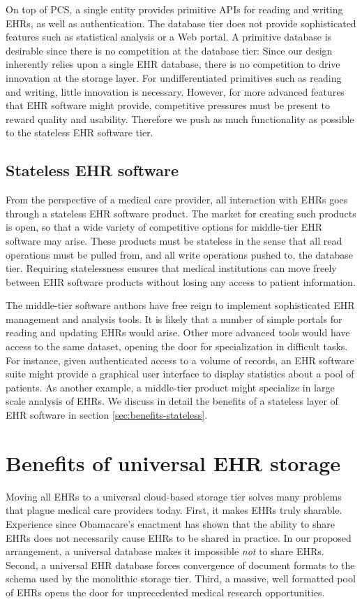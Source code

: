 On top of PCS, a single entity provides primitive APIs for reading and writing EHRs, as well as authentication. The database tier does not provide sophisticated features such as statistical analysis or a Web portal. A primitive database is desirable since there is no competition at the database tier: Since our design inherently relies upon a single EHR database, there is no competition to drive innovation at the storage layer. For undifferentiated primitives such as reading and writing, little innovation is necessary. However, for more advanced features that EHR software might provide, competitive pressures must be present to reward quality and usability. Therefore we push as much functionality as possible to the stateless EHR software tier.

\subsection{Stateless EHR software}\label{sec:stateless}
From the perspective of a medical care provider, all interaction with EHRs goes through a stateless EHR software product. The market for creating such products is open, so that a wide variety of competitive options for middle-tier EHR software may arise. These products must be stateless in the sense that all read operations must be pulled from, and all write operations pushed to, the database tier. Requiring statelessness ensures that medical institutions can move freely between EHR software products without losing any access to patient information.

The middle-tier software authors have free reign to implement sophisticated EHR management and analysis tools. It is likely that a number of simple portals for reading and updating EHRs would arise. Other more advanced tools would have access to the same dataset, opening the door for specialization in difficult tasks. For instance, given authenticated access to a volume of records, an EHR software suite might provide a graphical user interface to display statistics about a pool of patients. As another example, a middle-tier product might specialize in large scale analysis of EHRs. We discuss in detail the benefits of a stateless layer of EHR software in section \ref{sec:benefits-stateless}.

\section{Benefits of universal EHR storage}\label{sec:benefits-database}
Moving all EHRs to a universal cloud-based storage tier solves many problems that plague medical care providers today. First, it makes EHRs truly sharable. Experience since Obamacare's enactment has shown that the ability to share EHRs does not necessarily cause EHRs to be shared in practice. In our proposed arrangement, a universal database makes it impossible \textit{not} to share EHRs. Second, a universal EHR database forces convergence of document formats to the schema used by the monolithic storage tier. Third, a massive, well formatted pool of EHRs opens the door for unprecedented medical research opportunities.

